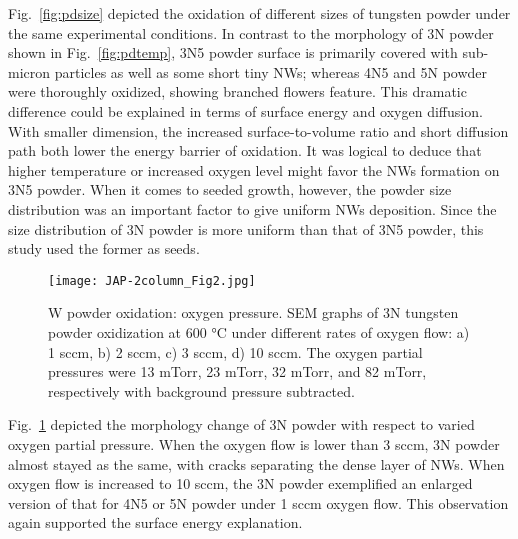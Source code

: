 Fig.~\ref{fig:pdsize} depicted the oxidation of different sizes of tungsten powder under the same experimental conditions. In contrast to the morphology of 3N powder shown in Fig.~\ref{fig:pdtemp}, 3N5 powder surface is primarily covered with sub-micron particles as well as some short tiny NWs; whereas 4N5 and 5N powder were thoroughly oxidized, showing branched flowers feature. This dramatic difference could be explained in terms of surface energy and oxygen diffusion. With smaller dimension, the increased surface-to-volume ratio and short diffusion path both lower the energy barrier of oxidation.\cite{tungsten1999} It was logical to deduce that higher temperature or increased oxygen level might favor the NWs formation on 3N5 powder. When it comes to seeded growth, however, the powder size distribution was an important factor to give uniform NWs deposition. Since the size distribution of 3N powder is more uniform than that of 3N5 powder, this study used the former as seeds.
\begin{figure}[htb]
\centering
\texttt{[image: JAP-2column\_Fig2.jpg]}
\caption[W powder oxidation: oxygen pressure]{W powder oxidation: oxygen pressure. SEM graphs of 3N tungsten powder oxidization at 600 \si{\degreeCelsius} under different rates of oxygen flow: a) 1 sccm, b) 2 sccm, c) 3 sccm, d) 10 sccm. The oxygen partial pressures were 13 mTorr, 23 mTorr, 32 mTorr, and 82 mTorr, respectively with background pressure subtracted.}
\label{fig:pdoxy}
\end{figure}

Fig.~\ref{fig:pdoxy} depicted the morphology change of 3N powder with respect to varied oxygen partial pressure. When the oxygen flow is lower than 3 sccm, 3N powder almost stayed as the same, with cracks separating the dense layer of NWs. When oxygen flow is increased to 10 sccm, the 3N powder exemplified an enlarged version of that for 4N5 or 5N powder under 1 sccm oxygen flow. This observation again supported the surface energy explanation.

